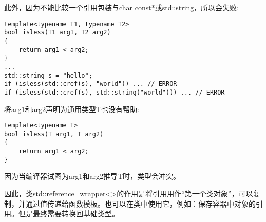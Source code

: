 此外，因为不能比较一个引用包装与char const*或std::string，所以会失败:

\begin{lstlisting}[style=styleCXX]
template<typename T1, typename T2>
bool isless(T1 arg1, T2 arg2)
{
	return arg1 < arg2;
}
...
std::string s = "hello";
if (isless(std::cref(s), "world")) ... // ERROR
if (isless(std::cref(s), std::string("world"))) ... // ERROR
\end{lstlisting}

将arg1和arg2声明为通用类型T也没有帮助:

\begin{lstlisting}[style=styleCXX]
template<typename T>
bool isless(T arg1, T arg2)
{
	return arg1 < arg2;
}
\end{lstlisting}

因为当编译器试图为arg1和arg2推导T时，类型会冲突。

因此，类std::reference\_wrapper<>的作用是将引用用作“第一个类对象”，可以复制，并通过值传递给函数模板。也可以在类中使用它，例如：保存容器中对象的引用。但是最终需要转换回基础类型。











